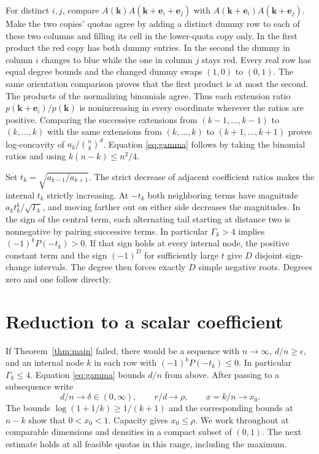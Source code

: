 \documentclass[11pt]{article}
\begin{document}
For distinct $i,j$, compare
$A(\mathbf{k}) A(\mathbf{k}+\mathbf e_i+\mathbf e_j)$ with
$A(\mathbf{k}+\mathbf e_i)A(\mathbf{k}+\mathbf e_j)$.
Make the two copies' quotas agree by adding a distinct dummy row to
each of these two columns and filling its cell in the lower-quota copy
only. In the first product the red copy has both dummy entries. In the
second the dummy in column $i$ changes to blue while the one in column
$j$ stays red. Every real row has equal degree bounds and the changed
dummy swaps $(1,0)$ to $(0,1)$. The same orientation comparison proves
that the first product is at most the second. The products of the
normalizing binomials agree. Thus each extension ratio
$p(\mathbf{k}+\mathbf e_i)/p(\mathbf{k})$ is nonincreasing in every
coordinate wherever the ratios are positive. Comparing the successive
extensions from $(k-1,\ldots,k-1)$ to $(k,\ldots,k)$ with the same
extensions from $(k,\ldots,k)$ to $(k+1,\ldots,k+1)$ proves log-concavity
of $a_k/\binom nk^d$. Equation \eqref{eq:gamma} follows by taking the
binomial ratios and using $k(n-k)\le n^2/4$.

Set $t_k=\sqrt{a_{k-1}/a_{k+1}}$. The strict decrease of adjacent
coefficient ratios makes the internal $t_k$ strictly increasing.
At $-t_k$ both neighboring terms have magnitude
$a_kt_k^k/\sqrt{\Gamma_k}$, and moving farther out on either side
decreases the magnitudes. In the sign of the central term, each
alternating tail starting at distance two is nonnegative by pairing
successive terms. In particular $\Gamma_k>4$ implies
$(-1)^kP(-t_k)>0$. If that sign holds at every internal node, the
positive constant term and the sign $(-1)^D$ for sufficiently large
$t$ give $D$ disjoint sign-change intervals. The degree then forces
exactly $D$ simple negative roots. Degrees zero and one follow directly.

\section{Reduction to a scalar coefficient}\label{sec:counting}

If Theorem~\ref{thm:main} failed, there would be a sequence with
$n\to\infty$, $d/n\ge\epsilon$, and an internal node $k$ in each row
with $(-1)^kP(-t_k)\le0$. In particular $\Gamma_k\le4$.
Equation \eqref{eq:gamma} bounds $d/n$ from above.
After passing to a subsequence write
\[
d/n\to\delta\in(0,\infty),\qquad r/d\to\rho,\qquad x=k/n\to x_0.
\]
The bounds $\log(1+1/k)\ge 1/(k+1)$ and the corresponding bounds
at $n-k$ show that $0<x_0<1$. Capacity gives $x_0\le\rho$.
We work throughout at comparable dimensions and densities in a compact
subset of $(0,1)$. The next estimate holds at all feasible quotas in
this range, including the maximum.
\end{document}
